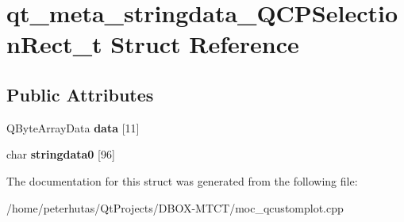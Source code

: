 \hypertarget{structqt__meta__stringdata___q_c_p_selection_rect__t}{}\section{qt\+\_\+meta\+\_\+stringdata\+\_\+\+Q\+C\+P\+Selection\+Rect\+\_\+t Struct Reference}
\label{structqt__meta__stringdata___q_c_p_selection_rect__t}
\subsection*{Public Attributes}
\begin{DoxyCompactItemize}
\item 
\mbox{\label{structqt__meta__stringdata___q_c_p_selection_rect__t_aa58583b159c4713d8ea71032fddcc13f}} 
Q\+Byte\+Array\+Data {\bfseries data} \mbox{[}11\mbox{]}
\item 
\mbox{\label{structqt__meta__stringdata___q_c_p_selection_rect__t_a39a87de1040c403f0ba00fdaedecbb79}} 
char {\bfseries stringdata0} \mbox{[}96\mbox{]}
\end{DoxyCompactItemize}


The documentation for this struct was generated from the following file\+:\begin{DoxyCompactItemize}
\item 
/home/peterhutas/\+Qt\+Projects/\+D\+B\+O\+X-\/\+M\+T\+C\+T/moc\+\_\+qcustomplot.\+cpp\end{DoxyCompactItemize}
